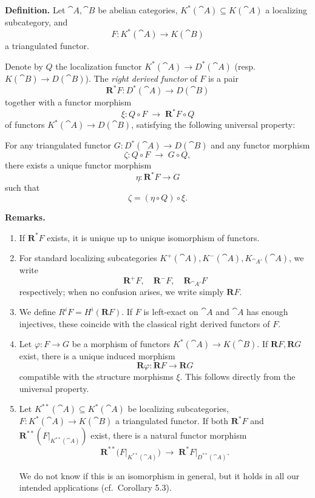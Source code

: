 \medskip
\textbf{Definition.}
Let \(\cat{A},\cat{B}\) be abelian categories, \(K^*(\cat{A})\subseteq K(\cat{A})\) a localizing subcategory, and
\[
F\colon K^*(\cat{A})\to K(\cat{B})
\]
a triangulated functor.

Denote by \(Q\) the localization functor \(K^*(\cat{A})\to D^*(\cat{A})\) (resp.\ \(K(\cat{B})\to D(\cat{B})\)). The \textit{right derived functor} of \(F\) is a pair
\[
\mathbf{R}^*F\colon D^*(\cat{A})\to D(\cat{B})
\]
together with a functor morphism
\[
\xi\colon Q\circ F \;\to\; \mathbf{R}^*F\circ Q
\]
of functors \(K^*(\cat{A})\to D(\cat{B})\), satisfying the following universal property:

\setcounter{page}{51}
For any triangulated functor \(G\colon D^*(\cat{A})\to D(\cat{B})\) and any functor morphism
\[
\zeta\colon Q\circ F \;\to\; G\circ Q,
\]
there exists a unique functor morphism
\[
\eta\colon \mathbf{R}^*F \to G
\]
such that
\[
\zeta = (\eta\circ Q)\circ \xi.
\]

\medskip
\textbf{Remarks.}
\begin{enumerate}
\item If \(\mathbf{R}^*F\) exists, it is unique up to unique isomorphism of functors.
\item For standard localizing subcategories \(K^+(\cat{A}),K^-(\cat{A}),K_{\cat{A}'}(\cat{A})\), we write
\[
\mathbf{R}^+F,\quad \mathbf{R}^-F,\quad \mathbf{R}_{\cat{A}'}F
\]
respectively; when no confusion arises, we write simply \(\mathbf{R}F\).

\setcounter{page}{52}
\item We define \(R^iF = H^i(\mathbf{R}F)\). If \(F\) is left-exact on \(\cat{A}\) and \(\cat{A}\) has enough injectives, these coincide with the classical right derived functors of \(F\).
\item Let \(\varphi\colon F\to G\) be a morphism of functors \(K^*(\cat{A})\to K(\cat{B})\). If \(\mathbf{R}F,\mathbf{R}G\) exist, there is a unique induced morphism
\[
\mathbf{R}\varphi\colon \mathbf{R}F\to\mathbf{R}G
\]
compatible with the structure morphisms \(\xi\). This follows directly from the universal property.
\item Let \(K^{**}(\cat{A})\subseteq K^*(\cat{A})\) be localizing subcategories, \(F\colon K^*(\cat{A})\to K(\cat{B})\) a triangulated functor. If both \(\mathbf{R}^*F\) and \(\mathbf{R}^{**}(F|_{K^{**}(\cat{A})})\) exist, there is a natural functor morphism
\[
\mathbf{R}^{**}\big(F|_{K^{**}(\cat{A})}\big)
\;\to\;
\mathbf{R}^*F\big|_{D^{**}(\cat{A})}.
\]

\setcounter{page}{53}
We do not know if this is an isomorphism in general, but it holds in all our intended applications (cf.\ Corollary 5.3).
\end{enumerate}

